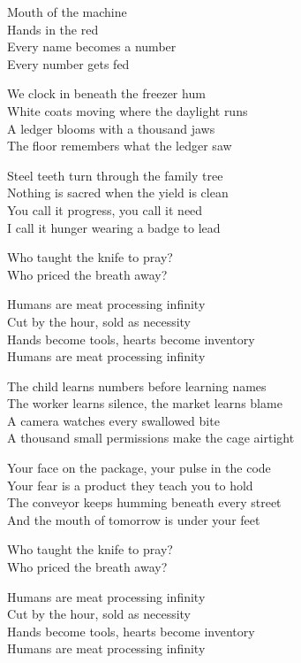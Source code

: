 \begin{lyrics}
Mouth of the machine\\
Hands in the red\\
Every name becomes a number\\
Every number gets fed

We clock in beneath the freezer hum\\
White coats moving where the daylight runs\\
A ledger blooms with a thousand jaws\\
The floor remembers what the ledger saw

Steel teeth turn through the family tree\\
Nothing is sacred when the yield is clean\\
You call it progress, you call it need\\
I call it hunger wearing a badge to lead

Who taught the knife to pray?\\
Who priced the breath away?

Humans are meat processing infinity\\
Cut by the hour, sold as necessity\\
Hands become tools, hearts become inventory\\
Humans are meat processing infinity

The child learns numbers before learning names\\
The worker learns silence, the market learns blame\\
A camera watches every swallowed bite\\
A thousand small permissions make the cage airtight

Your face on the package, your pulse in the code\\
Your fear is a product they teach you to hold\\
The conveyor keeps humming beneath every street\\
And the mouth of tomorrow is under your feet

Who taught the knife to pray?\\
Who priced the breath away?

Humans are meat processing infinity\\
Cut by the hour, sold as necessity\\
Hands become tools, hearts become inventory\\
Humans are meat processing infinity


\end{lyrics}
